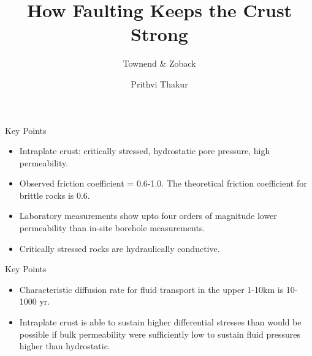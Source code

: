 \documentclass[12pt]{beamer}
\title{How Faulting Keeps the Crust Strong}
\subtitle{Townend \& Zoback}
\date{}
\author{Prithvi Thakur}
\institute{Paper discussion}
\begin{document}
\maketitle

\begin{frame}[fragile]{Key Points}
    \begin{itemize}
        \item Intraplate crust: critically stressed, hydrostatic pore pressure, high permeability.
        \item Observed friction coefficient = 0.6-1.0. The theoretical friction coefficient for brittle rocks is 0.6.
        \item Laboratory measurements show upto four orders of magnitude lower permeability than in-site borehole measurements.
        \item Critically stressed rocks are hydraulically conductive.
    \end{itemize}
\end{frame}

\begin{frame}[fragile]{Key Points}
    \begin{itemize}
        \item Characteristic diffusion rate for fluid transport in the upper 1-10km is 10-1000 yr. 
        \item Intraplate crust is able to sustain higher differential stresses than would be possible if bulk permeability were sufficiently low to sustain fluid pressures higher than hydrostatic.
    \end{itemize}
\end{frame}
\end{document}
